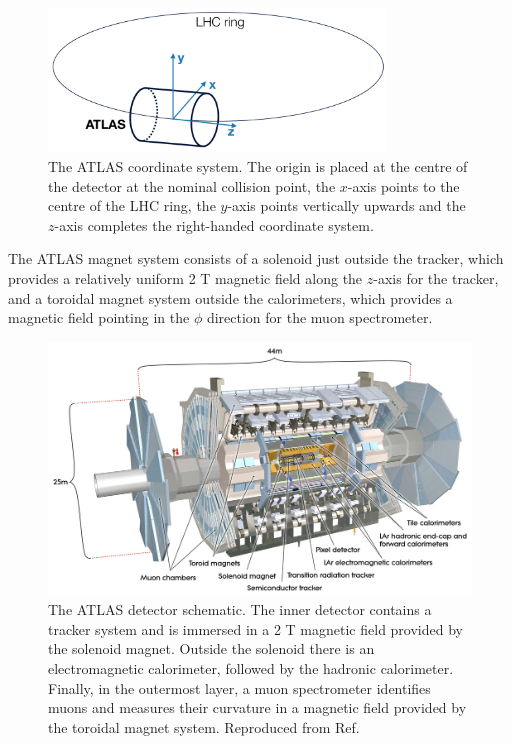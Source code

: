 \begin{figure}[h]
  \centering
  \includegraphics[width=0.8\textwidth]{figures/experiment/ATLAS_coordinate_system}
  \caption[ATLAS coordinate system]{The ATLAS coordinate system. The origin is placed
  at the centre of the detector at the nominal collision point, the $x$-axis
  points to the centre of the LHC ring, the $y$-axis points vertically upwards and
  the $z$-axis completes the right-handed coordinate system.
  }
  \label{fig:exp:coordinate_system}
\end{figure}

The ATLAS magnet system consists of a solenoid just outside the tracker,
which provides a relatively uniform 2 T magnetic field along the $z$-axis
for the tracker,
and a toroidal magnet system outside the calorimeters, which provides a
magnetic field pointing in the $\phi$ direction for the muon spectrometer.

\begin{figure}[h]
  \centering
  \includegraphics[width=1\textwidth]{figures/experiment/atlas}
  \caption[The ATLAS detector]{The ATLAS detector schematic. The inner
  detector contains a tracker system and is immersed in a 2 T magnetic field
  provided by the solenoid magnet. Outside the solenoid there is
  an electromagnetic calorimeter, followed by the hadronic calorimeter.
  Finally, in the outermost layer, a muon spectrometer identifies muons
  and measures their curvature in a magnetic field provided by the
  toroidal magnet system.
  Reproduced from Ref. \cite{Aad:2008zzm}}
   \label{fig:exp:atlas}
\end{figure}

